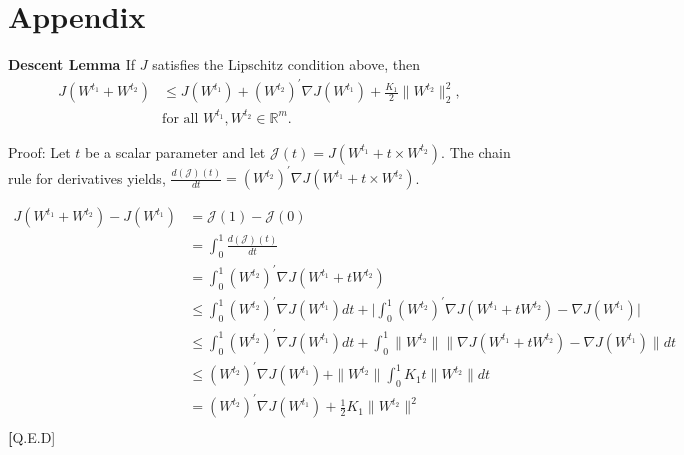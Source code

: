 

\newpage

\section*{Appendix}
\textbf{Descent Lemma \cite{Bertsekas_97} } If $J$ satisfies the Lipschitz condition above, then
\begin{align*}
\label{desLips}
J(W^{t_1}+W^{t_2}) &\le J(W^{t_1}) + (W^{t_2})^{'}  \nabla J(W^{t_1})+ \frac{K_1}{2} \parallel W^{t_2}\parallel_2^2,  \\
                    &\text{for all }W^{t_1}, W^{t_2} \in \mathbb{R}^m.
\end{align*}

\noindent Proof: Let $t$ be a scalar parameter and let $\mathcal{J}(t)=J(W^{t_1} + t \times W^{t_2})$. The chain rule for derivatives yields, 
$\frac{d(\mathcal{J})(t)}{dt} = (W^{t_2})^{'} \nabla J(W^{t_1} + t \times W^{t_2})$. 

\begin{align*}
J(W^{t_1}+W^{t_2})  - J(W^{t_1}) &=  \mathcal{J}(1) - \mathcal{J}(0) \\
                         &= \int_{0}^{1} \frac{d(\mathcal{J})(t)}{dt} \\
                         &= \int_{0}^{1} (W^{t_2})^{'} \nabla J(W^{t_1} + t W^{t_2}) \\
                         &\le \int_{0}^{1} (W^{t_2})^{'} \nabla J(W^{t_1}) dt +  \lvert \int_{0}^{1} (W^{t_2})^{'} \nabla  J(W^{t_1} + t  W^{t_2}) -  \nabla J(W^{t_1}) \rvert \\
                         &\le \int_{0}^{1} (W^{t_2})^{'} \nabla J(W^{t_1}) dt + \int_{0}^{1} \parallel W^{t_2}\parallel  \parallel  \nabla  J(W^{t_1} + t  W^{t_2}) -  \nabla J(W^{t_1}) \parallel dt \\
                         &\le (W^{t_2})^{'} \nabla J(W^{t_1}) + \parallel W^{t_2}\parallel   \int_{0}^{1} K_1 t \parallel W^{t_2}\parallel   dt \\
                         &=(W^{t_2})^{'} \nabla J(W^{t_1})  + \frac{1}{2} K_1 \parallel W^{t_2}\parallel^2 \\
\end{align*}
\noindent \textbf[Q.E.D]

